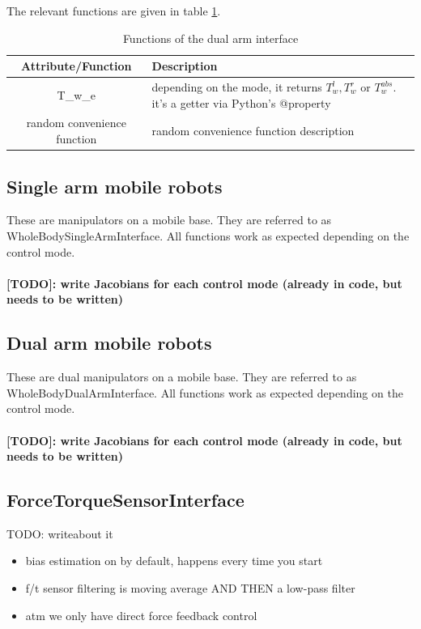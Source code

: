 The relevant functions are given in table \ref{table-dual-arm-interface}.

\begin{table}[h!]
		\centering
		\label{table-dual-arm-interface}
		\begin{tabular}{c|p{7cm}}
\textbf{Attribute/Function} & \textbf{Description}\\
\hline 
T\_w\_e & depending on the mode, it returns
$ T_{ w }^{ l }, T_{ w }^{ r }  $ or $ T_{ w }^{ abs }  $. 
it's a getter via Python's @property\\
\hline 
[TODO] random convenience function & random convenience function description
		\end{tabular}
		\caption{Functions of the dual arm interface}
\end{table}

\subsection{Single arm mobile robots}
These are manipulators on a mobile base. They are referred to as
WholeBodySingleArmInterface.
All functions work as expected depending on the control mode.
\paragraph{[TODO]: write Jacobians for each control mode (already in code, but needs to be written)}

\subsection{Dual arm mobile robots}
These are dual manipulators on a mobile base. They are referred to as
WholeBodyDualArmInterface.
All functions work as expected depending on the control mode.
\paragraph{[TODO]: write Jacobians for each control mode (already in code, but needs to be written)}

\subsection{ForceTorqueSensorInterface}
TODO: writeabout it
\begin{itemize}
		\item bias estimation on by default, happens every time you start 
		\item f/t sensor filtering is moving average AND THEN a low-pass filter
		\item atm we only have direct force feedback control
\end{itemize}


